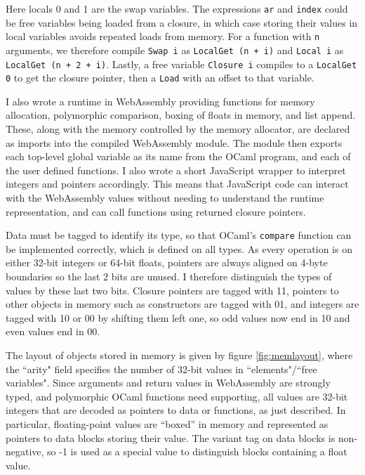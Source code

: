 Here locals 0 and 1 are the swap variables. The expressions \verb|ar| and \verb|index| could be free variables being loaded from a closure, in which case storing their values in local variables avoids repeated loads from memory. 
 For a function with \verb|n| arguments, we therefore compile \verb|Swap i| as \verb|LocalGet (n + i)| and \verb|Local i| as \verb|LocalGet (n + 2 + i)|. Lastly,  a free variable \verb|Closure i| compiles to a \verb|LocalGet 0| to get the closure pointer, then a \verb|Load| with an offset to that variable.



I also wrote a runtime in WebAssembly providing functions for memory allocation, polymorphic comparison, boxing of floats in memory, and list append. These, along with the memory controlled by the memory allocator, are declared as imports into the compiled WebAssembly module. The module then exports each top-level global variable as its name from the OCaml program, and each of the user defined functions. 
I also wrote a short JavaScript wrapper to interpret integers and pointers accordingly. This means that JavaScript code can interact with the WebAssembly values without needing to understand the runtime representation, and can call functions using returned closure pointers.

Data must be tagged to identify its type, so that OCaml's \verb|compare| function can be implemented correctly, which is defined on all types. As every operation is on either 32-bit integers or 64-bit floats, pointers are always aligned on 4-byte boundaries so the last 2 bits are unused. I therefore distinguish the types of values by these last two bits. Closure pointers are tagged with 11, pointers to other objects in memory such as constructors are tagged with 01, and integers are tagged with 10 or 00 by shifting them left one, so odd values now end in 10 and even values end in 00. 

The layout of objects stored in memory is given by figure \ref{fig:memlayout}, where the ``arity" field specifies the number of 32-bit values in ``elements"/``free variables". Since arguments and return values in WebAssembly are strongly typed, and polymorphic OCaml functions need supporting, all values are 32-bit integers that are decoded as pointers to data or functions, as just described. In particular, floating-point values are ``boxed'' in memory and represented as pointers to data blocks storing their value. The variant tag on data blocks is non-negative, so -1 is used as a special value to distinguish blocks containing a float value.\\


